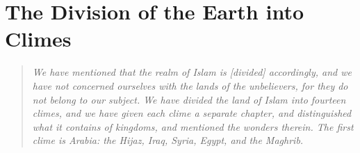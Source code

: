 \documentclass[11pt,a4paper]{article}
\begin{document}
\clearpage






\tableofcontents

\clearpage








\section{The Division of the Earth into Climes}



{\small\arabicfont

}



\bigskip



\begin{quote}

\small

\textit{We have mentioned that the realm of Islam is [divided] accordingly, and we have not concerned ourselves with the lands of the unbelievers, for they do not belong to our subject. We have divided the land of Islam into fourteen climes, and we have given each clime a separate chapter, and distinguished what it contains of kingdoms, and mentioned the wonders therein. The first clime is Arabia: the Hijaz, Iraq, Syria, Egypt, and the Maghrib.}

\end{quote}
\end{document}
